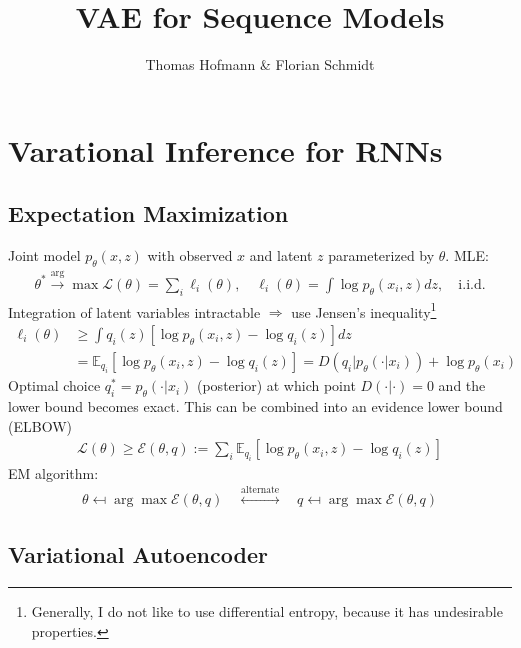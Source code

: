 \documentclass[a4paper,10pt]{article}
\title{VAE for Sequence Models}
\author{Thomas Hofmann \& Florian Schmidt}
\newcommand\E{\mathbb E}
\begin{document}
\maketitle

\section{Varational Inference for RNNs}

\subsection{Expectation Maximization}

Joint model $p_\theta(x,z)$ with observed $x$ and latent $z$ parameterized by $\theta$. MLE:
\begin{align}
\theta^* \stackrel \arg \to \max \mathcal L(\theta) = \sum_{i} \ell_i(\theta), \quad \ell_i(\theta) = \int \log p_\theta(x_i,z) dz, \quad \text{i.i.d.}
\end{align}
Integration of latent variables intractable $\Longrightarrow$ use Jensen's inequality\footnote{Generally, I do not like to use differential entropy, because it has undesirable properties.}
\begin{align}
\ell_i(\theta) & 
\ge \int q_i(z) \left[ \log p_\theta(x_i,z) -  \log q_i(z) \right] dz
\\
\label{eq:elbow-single}
&  = \E_{q_i}\left[ \log p_\theta(x_i,z) -  \log q_i(z) \right]
 =  D(q_i | p_\theta(\cdot|x_i)) + \log p_\theta(x_i)
\end{align}
Optimal choice $q_i^* = p_\theta(\cdot|x_i)$ (posterior) at which point $D(\cdot|\cdot)=0$ and the lower bound becomes exact. This can be combined into an evidence lower bound (ELBOW) 
\begin{align}
\mathcal L(\theta) \ge \mathcal E(\theta,q) := \sum_{i} \E_{q_i}\left[ \log p_\theta(x_i,z) -  \log q_i(z) \right]
\label{eq:elbow}
\end{align}
EM algorithm: 
\begin{align}
\theta \mapsfrom \arg\max \mathcal E(\theta,q) \quad \stackrel{\text{alternate}}\longleftrightarrow \quad q \mapsfrom \arg\max \mathcal E(\theta,q)
\end{align}

\subsection{Variational Autoencoder}
\end{document}
